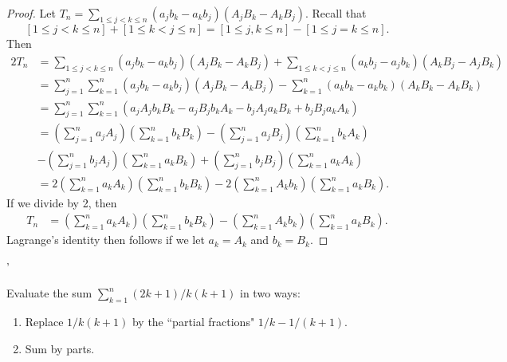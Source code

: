 \documentclass[12pt]{article}
\newenvironment{ex}[2][Exercise]{\begin{trivlist}
		\item[\hskip \labelsep {\bfseries #1}\hskip \labelsep {\bfseries #2.}]}{\end{trivlist}}
\newenvironment{sol}[1][Solution]{\begin{trivlist}
		\item[\hskip \labelsep {\bfseries #1:}]}{\end{trivlist}}
\begin{document}
\begin{sol}
	\
	\begin{proof}
		Let $T_n=\sum_{1\leq j<k\leq n}\left(a_jb_k-a_kb_j\right)\left(A_jB_k-A_kB_j\right)$.
		Recall that
		\[
		[1\leq j<k\leq n]+[1\leq k<j\leq n]=[1\leq j, k\leq n]-[1\leq j=k\leq n].
		\]
		Then
		\begin{align*}
			2T_n&=\sum_{1\leq j<k\leq n}\left(a_jb_k-a_kb_j\right)\left(A_jB_k-A_kB_j\right)+
			\sum_{1\leq k<j\leq n}\left(a_kb_j-a_jb_k\right)\left(A_kB_j-A_jB_k\right)\\
			&=\sum_{j=1}^{n}\sum_{k=1}^{n}\left(a_jb_k-a_kb_j\right)\left(A_jB_k-A_kB_j\right)
			-\sum_{k=1}^{n}\left(a_kb_k-a_kb_k\right)\left(A_kB_k-A_kB_k\right)\\
			&=\sum_{j=1}^{n}\sum_{k=1}^{n}\left(
			a_jA_jb_kB_k-a_jB_jb_kA_k-b_jA_ja_kB_k+b_jB_ja_kA_k
			\right)\\
			&=\left(\sum_{j=1}^{n}a_jA_j\right)\left(\sum_{k=1}^{n}b_kB_k\right)
			-\left(\sum_{j=1}^{n}a_jB_j\right)\left(\sum_{k=1}^{n}b_kA_k\right)\\
			&-\left(\sum_{j=1}^{n}b_jA_j\right)\left(\sum_{k=1}^{n}a_kB_k\right)
			+\left(\sum_{j=1}^{n}b_jB_j\right)\left(\sum_{k=1}^{n}a_kA_k\right)\\
			&=2\left(\sum_{k=1}^{n}a_kA_k\right)\left(\sum_{k=1}^{n}b_kB_k\right)
			-2\left(\sum_{k=1}^{n}A_kb_k\right)\left(\sum_{k=1}^{n}a_kB_k\right).
		\end{align*}
		If we divide by 2, then
		\begin{align*}
			T_n&=\left(\sum_{k=1}^{n}a_kA_k\right)\left(\sum_{k=1}^{n}b_kB_k\right)
			-\left(\sum_{k=1}^{n}A_kb_k\right)\left(\sum_{k=1}^{n}a_kB_k\right).
		\end{align*}
		Lagrange's identity then follows if we let $a_k=A_k$ and $b_k=B_k$.
	\end{proof}
\end{sol}'

\begin{ex}{23}
	Evaluate the sum $\sum_{k=1}^{n}(2k+1)/k(k+1)$ in two ways:
	\begin{enumerate}[label=(\alph*)]
		\item Replace $1/k(k+1)$ by the ``partial fractions" $1/k-1/(k+1)$.
		\item Sum by parts.
	\end{enumerate}
\end{ex}
\end{document}
